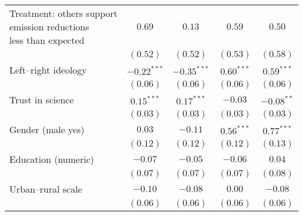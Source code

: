 \begin{table}[h]
\begin{center}
\begin{tabular}{l c c c c}
\shortstack{Treatment: others support\\emission reductions\\less than expected}                              & $0.69$        & $0.13$        & $0.59$        & $0.50$        \\
                                                                                                             & $(0.52)$      & $(0.52)$      & $(0.53)$      & $(0.58)$      \\
Left–right ideology                                                                                          & $-0.22^{***}$ & $-0.35^{***}$ & $0.60^{***}$  & $0.59^{***}$  \\
                                                                                                             & $(0.06)$      & $(0.06)$      & $(0.06)$      & $(0.06)$      \\
Trust in science                                                                                             & $0.15^{***}$  & $0.17^{***}$  & $-0.03$       & $-0.08^{**}$  \\
                                                                                                             & $(0.03)$      & $(0.03)$      & $(0.03)$      & $(0.03)$      \\
Gender (male yes)                                                                                            & $0.03$        & $-0.11$       & $0.56^{***}$  & $0.77^{***}$  \\
                                                                                                             & $(0.12)$      & $(0.12)$      & $(0.12)$      & $(0.13)$      \\
Education (numeric)                                                                                          & $-0.07$       & $-0.05$       & $-0.06$       & $0.04$        \\
                                                                                                             & $(0.07)$      & $(0.07)$      & $(0.07)$      & $(0.08)$      \\
Urban–rural scale                                                                                            & $-0.10$       & $-0.08$       & $0.00$        & $-0.08$       \\
                                                                                                             & $(0.06)$      & $(0.06)$      & $(0.06)$      & $(0.06)$      \\

\end{tabular}
\end{center}
\end{table}
